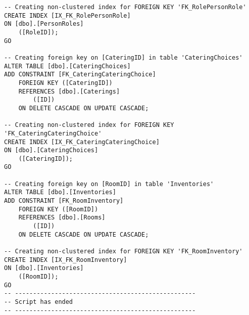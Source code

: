 \begin{lstlisting}[label=SQL, caption= SQL-kode til oprettelse af database]
-- Creating non-clustered index for FOREIGN KEY 'FK_RolePersonRole'
CREATE INDEX [IX_FK_RolePersonRole]
ON [dbo].[PersonRoles]
    ([RoleID]);
GO

-- Creating foreign key on [CateringID] in table 'CateringChoices'
ALTER TABLE [dbo].[CateringChoices]
ADD CONSTRAINT [FK_CateringCateringChoice]
    FOREIGN KEY ([CateringID])
    REFERENCES [dbo].[Caterings]
        ([ID])
    ON DELETE CASCADE ON UPDATE CASCADE;

-- Creating non-clustered index for FOREIGN KEY 'FK_CateringCateringChoice'
CREATE INDEX [IX_FK_CateringCateringChoice]
ON [dbo].[CateringChoices]
    ([CateringID]);
GO

-- Creating foreign key on [RoomID] in table 'Inventories'
ALTER TABLE [dbo].[Inventories]
ADD CONSTRAINT [FK_RoomInventory]
    FOREIGN KEY ([RoomID])
    REFERENCES [dbo].[Rooms]
        ([ID])
    ON DELETE CASCADE ON UPDATE CASCADE;

-- Creating non-clustered index for FOREIGN KEY 'FK_RoomInventory'
CREATE INDEX [IX_FK_RoomInventory]
ON [dbo].[Inventories]
    ([RoomID]);
GO
-- --------------------------------------------------
-- Script has ended
-- --------------------------------------------------
\end{lstlisting}